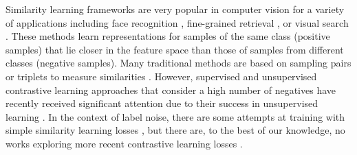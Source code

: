 \documentclass[final]{cvpr}
\begin{document}
Similarity learning frameworks are very popular in computer vision for a variety of applications including face recognition \cite{2018_CVPR_Cosface}, fine-grained retrieval \cite{2019_ICCV_SoftTripleLoss}, or visual search \cite{2019_ICCV_MetricLearningExample}.
These methods learn representations for samples of the same class (positive samples) that lie closer in the feature space than those of samples from different classes (negative samples). Many traditional methods are based on sampling pairs or triplets to measure similarities \cite{2005_CVPR_SiamesePairs,2018_arXiv_DeepTriplets}. However, supervised and unsupervised contrastive learning approaches that consider a high number of negatives have recently received significant attention due to their success in unsupervised learning \cite{2020_ICML_SimCLR,2020_CVPR_MoCo,2020_IEEE_COntrastiveSurvey}. In the context of label noise, there are some attempts at training with simple similarity learning losses \cite{2018_CVPR_IterativeNoise}, but there are, to the best of our knowledge, no works exploring more recent contrastive learning losses \cite{2020_arXiv_SupContLearn}.
\end{document}
